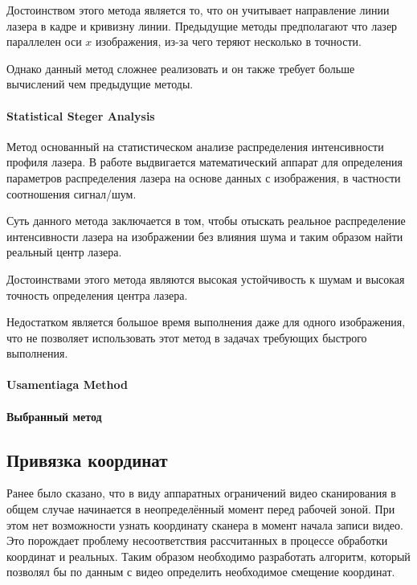                Достоинством этого метода является то, что он учитывает направление линии лазера в кадре и кривизну линии. Предыдущие методы предполагают что лазер параллелен оси $ x $ изображения, из-за чего теряют несколько в точности.
                
                Однако данный метод сложнее реализовать и он также требует больше вычислений чем предыдущие методы.
                
            \paragraph{Statistical Steger Analysis}
                Метод основанный на статистическом анализе распределения интенсивности профиля лазера. В работе \cite{Qi2013} выдвигается математический аппарат для определения параметров распределения лазера на основе данных с изображения, в частности соотношения сигнал/шум.
                
                Суть данного метода заключается в том, чтобы отыскать реальное распределение интенсивности лазера на изображении без влияния шума и таким образом найти реальный центр лазера.
                
                Достоинствами этого метода являются высокая устойчивость к шумам и высокая точность определения центра лазера.
                
                Недостатком является большое время выполнения даже для одного изображения, что не позволяет использовать этот метод в задачах требующих быстрого выполнения.
            
            \paragraph{Usamentiaga Method}\cite{Usamentiaga2012}
                
            
            \paragraph{Выбранный метод}
            
        \subsection{Привязка координат}
            Ранее было сказано, что в виду аппаратных ограничений видео сканирования в общем случае начинается в неопределённый момент перед рабочей зоной. При этом нет возможности узнать координату сканера в момент начала записи видео. Это порождает проблему несоответствия рассчитанных в процессе обработки координат и реальных. Таким образом необходимо разработать алгоритм, который позволял бы по данным с видео определить необходимое смещение координат.
            
